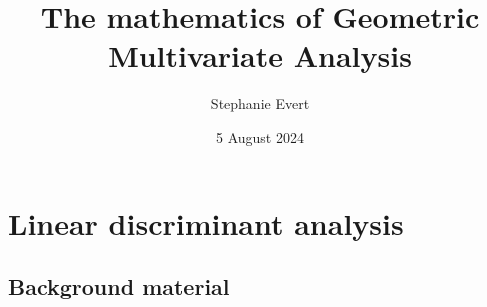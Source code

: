 \documentclass[a4paper]{article}
\title{The mathematics of Geometric Multivariate Analysis}
\author{Stephanie Evert}
\date{5 August 2024}
\begin{document}
\maketitle

\tableofcontents
\pagebreak

\section{Linear discriminant analysis}
\label{sec:lda}

\subsection{Background material}
\label{sec:lda:background}
\end{document}
